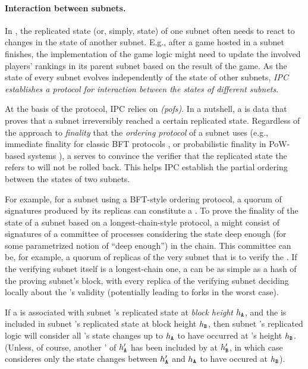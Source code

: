 \paragraph{Interaction between subnets.}
In \ipc, the replicated state (or, simply, state) of one subnet often needs to react to changes in the state of another subnet.
E.g., after a game hosted in a subnet finishes, the implementation of the game logic might need to update the involved players' rankings in its parent subnet based on the result of the game.
As the state of every subnet evolves independently of the state of other subnets,
\emph{IPC establishes a protocol for interaction between the states of different subnets}.

At the basis of the protocol, IPC relies on  \emph{\pofsFull (\glspl{pof})}.
In a nutshell, a \pof is data that proves that a subnet irreversibly reached a certain replicated state.
Regardless of the approach to \emph{\gls{finality}} that the  \emph{ordering protocol} of a subnet uses (e.g., immediate finality for classic BFT protocols \cite{Algorand}, or probabilistic finality in PoW-based systems \cite{nakamoto2008bitcoin}),
a \pof serves to convince the verifier that the replicated state the \pof refers to will not be rolled back. This helps IPC establish the partial ordering between the states of two subnets. 


For example, for a subnet using a BFT-style ordering protocol, a quorum of signatures produced by its replicas can constitute a \pof.
To prove the finality of the state of a subnet based on a longest-chain-style protocol,
a \pof might consist of signatures of a committee of processes considering the state deep enough (for some parametrized notion of ``deep enough'') in the chain.
This committee can be, for example, a quorum of replicas of the very subnet that is to verify the \pof.
If the verifying subnet itself is a longest-chain one, a \pof can be as simple as a hash of the proving subnet's block,
with every replica of the verifying subnet deciding locally about the \pof's validity (potentially leading to forks in the worst case).

If a \pof is associated with subnet 's replicated state at \emph{\gls{block height}} $h_{\textbf{\texttt{A}}}$,
and the \pof is included in subnet 's replicated state at block height $h_{\textbf{\texttt{B}}}$,
then subnet 's replicated logic will consider all 's state changes up to $h_{\textbf{\texttt{A}}}$
to have occurred at 's height $h_{\textbf{\texttt{B}}}$.
(Unless, of course, another \pof' of $h'_{\textbf{\texttt{A}}}$ has been included by  at $h'_{\textbf{\texttt{B}}}$,
in which case  consideres only the state changes between $h'_{\textbf{\texttt{A}}}$ and $h_{\textbf{\texttt{A}}}$ to have occured at $h_{\textbf{\texttt{B}}}$).

